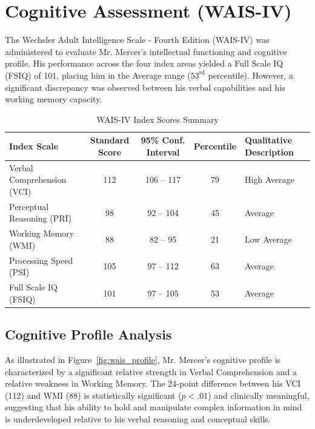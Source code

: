 \section{Cognitive Assessment (WAIS-IV)}

The Wechsler Adult Intelligence Scale - Fourth Edition (WAIS-IV) was administered to evaluate Mr. Mercer's intellectual functioning and cognitive profile. His performance across the four index areas yielded a Full Scale IQ (FSIQ) of 101, placing him in the Average range ($53^{\text{rd}}$ percentile). However, a significant discrepancy was observed between his verbal capabilities and his working memory capacity.

\begin{table}[H]
\centering
\caption{WAIS-IV Index Scores Summary}
\label{tab:wais_summary}
\begin{tabularx}{\textwidth}{l c c c X}
\toprule
\textbf{Index Scale} & \textbf{Standard Score} & \textbf{95\% Conf. Interval} & \textbf{Percentile} & \textbf{Qualitative Description} \\
\midrule
Verbal Comprehension (VCI) & 112 & 106 -- 117 & 79 & High Average \\
Perceptual Reasoning (PRI)  & 98  & 92 -- 104  & 45 & Average \\
Working Memory (WMI)       & 88  & 82 -- 95   & 21 & Low Average \\
Processing Speed (PSI)      & 105 & 97 -- 112  & 63 & Average \\
\midrule
Full Scale IQ (FSIQ)        & 101 & 97 -- 105  & 53 & Average \\
\bottomrule
\end{tabularx}
\end{table}

\subsection{Cognitive Profile Analysis}
As illustrated in Figure~\ref{fig:wais_profile}, Mr. Mercer's cognitive profile is characterized by a significant relative strength in Verbal Comprehension and a relative weakness in Working Memory. The 24-point difference between his VCI (112) and WMI (88) is statistically significant ($p < .01$) and clinically meaningful, suggesting that his ability to hold and manipulate complex information in mind is underdeveloped relative to his verbal reasoning and conceptual skills.

